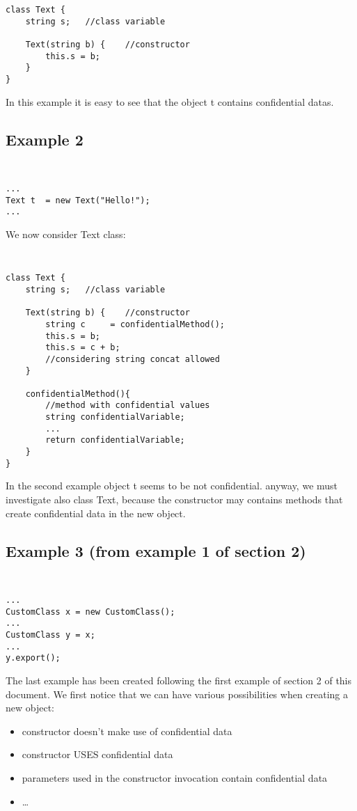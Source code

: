 \documentclass[letterpaper,twocolumn,10pt]{article}
\begin{document}
\begin{verbatim}
class Text {
    string s;	//class variable
	
    Text(string b) { 	//constructor
        this.s = b;
    }
}
\end{verbatim}

In this example it is easy to see that the object t contains confidential datas.\\

\subsection{Example 2}
{\tt \small
\begin{verbatim}
...
Text t	= new Text("Hello!");
...
\end{verbatim}
}
We now consider Text class: \\
{\tt \small
\begin{verbatim}
class Text {
    string s;	//class variable
	
    Text(string b) { 	//constructor
        string c	 = confidentialMethod();
        this.s = b;
        this.s = c + b;
        //considering string concat allowed
    }
	
    confidentialMethod(){ 
        //method with confidential values
        string confidentialVariable;		
        ...
        return confidentialVariable;
    }
}
\end{verbatim}
}

In the second example object t seems to be not confidential. anyway, we must investigate also class Text, because the constructor may contains methods that create confidential data in the new object.\\

\subsection{Example 3 (from example 1 of section 2)}
{\tt \small
\begin{verbatim}
...
CustomClass x = new CustomClass();
...
CustomClass y = x;
...
y.export();
\end{verbatim}
}

The last example has been created following the first example of section 2 of this document. We first notice that we can have various possibilities when creating a new object:\\

\begin{itemize}
  \item constructor doesn't make use of confidential data
  \item constructor USES confidential data
  \item parameters used in the constructor invocation contain confidential data
  \item \ldots
\end{itemize}
\end{document}
